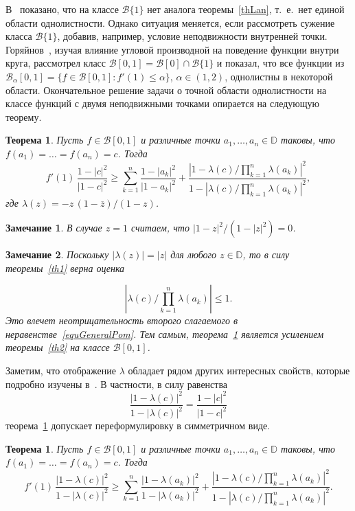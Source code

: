 \documentclass{article}
\theoremstyle{definition}
\theoremstyle{plain}
\newtheorem{remark}{Замечание}
\newtheorem{theorem}{Теорема}
\newtheorem{Theorem}{Теорема}
\begin{document}
В~\cite{KudrSol2019}  показано,
что на классе $\mathscr B\{1\}$ нет аналога теоремы~\ref{thLan}, т.~е.~нет единой области однолистности. Однако ситуация меняется, если рассмотреть сужение класса  $\mathscr B\{1\}$, добавив, например, условие неподвижности внутренней точки.
Горяйнов~\cite{Gor2017}, изучая влияние угловой производной на поведение функции внутри круга, рассмотрел класс $\mathscr B[0, 1] =\mathscr B[0]\cap \mathscr B\{1\}$ и
показал, что все функции из  $\mathscr B_{\alpha}[0, 1] =\bigl\{f\in\mathscr B[0,1]\colon f'(1)\leqslant \alpha\bigr\}$, $\alpha\in(1, 2)$, однолистны в некоторой области.
Окончательное решение задачи о точной области однолистности на  классе функций с двумя неподвижными точками опирается на следующую теорему.
\begin{theorem}\label{th3}
	Пусть  $f\in \mathscr B[0,1]$
	и  различные точки $a_1,\ldots,a_n\in \mathbb D$ таковы, что $f(a_1)=\ldots=f(a_n)=c$. Тогда
	\begin{equation}\label{equGeneralPom}
		f'(1)\,\frac{1-|c|^2}{|1-c|^2}\geqslant
		\sum_{k=1}^{n}\frac{1-|a_k|^2}{|1-a_k|^2}+
		\frac{|1-\lambda (c)/\prod_{k=1}^{n}\lambda(a_k)|^2}{1-|\lambda (c)/\prod_{k=1}^{n}\lambda(a_k)|^2},
	\end{equation}
	где
	$\lambda(z)=-z\,{(1-\overline{z})}/{(1-z)}$.
\end{theorem}
\begin{remark}
	В случае $z=1$ считаем, что $|1-z|^2/(1-|z|^2)=0$.	
\end{remark}
\begin{remark}
	Поскольку $|\lambda (z)|=|z|$ для любого $z\in\mathbb D$,
	то в силу теоремы~\ref{th1} верна оценка
	
$$
|\lambda (c)/\prod_{k=1}^{n}\lambda(a_k)|\leqslant 1.
$$
Это влечет неотрицательность второго слагаемого в неравенстве~\eqref{equGeneralPom}. Тем самым, теорема~\ref{th3} является усилением теоремы~\ref{th2} на классе   $\mathscr B[0, 1]$.
\end{remark}	
Заметим, что отображение $\lambda$  обладает рядом других интересных свойств, которые подробно изучены в~\cite{Sol2021}. В частности, в силу  равенства
\[
\frac{|1-\lambda(c)|^2}{1-|\lambda(c)|^2}=\frac{1-|c|^2}{|1-c|^2}
\]
теорема~\ref{th3} допускает переформулировку  в симметричном виде.
\begin{Theorem}\label{th3'}
	Пусть  $f\in \mathscr B[0,1]$
	и  различные точки $a_1,\ldots,a_n\in \mathbb D$ таковы, что $f(a_1)=\ldots=f(a_n)=c$. Тогда
	\begin{equation*}
		f'(1)\,\frac{|1-\lambda(c)|^2}{1-|\lambda(c)|^2}\geqslant
		\sum_{k=1}^{n}\frac{|1-\lambda(a_k)|^2}{1-|\lambda(a_k)|^2}+
		\frac{|1-\lambda (c)/\prod_{k=1}^{n}\lambda(a_k)|^2}{1-|\lambda (c)/\prod_{k=1}^{n}\lambda(a_k)|^2}.
	\end{equation*}
\end{Theorem}
\end{document}
